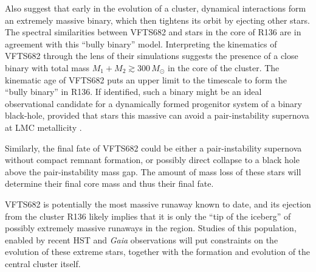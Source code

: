 \documentclass[a4paper,fleqn,usenatbib]{mnras}
\begin{document}
Also \cite{fujii:11} suggest that
early in the evolution of a cluster, dynamical interactions form an extremely
massive binary, which then tightens its orbit by ejecting other
stars. The spectral similarities between VFTS682 and stars in the core
of R136 are in agreement with this ``bully binary'' model. Interpreting the kinematics of VFTS682 through the lens of their simulations
suggests the presence of a close binary with total mass
$M_1+M_2\gtrsim 300\,M_\odot$ in the core of the cluster. The kinematic age of VFTS682 puts an
upper limit to the timescale to form the ``bully binary'' in
R136. If identified, such a binary %
might be an ideal observational candidate for a dynamically formed progenitor system of
a binary black-hole, provided that stars this massive can avoid a
pair-instability supernova \cite[e.g.,][]{rakavy:67} at LMC
metallicity \citep[see also][]{langer:07}.

Similarly, the final fate of VFTS682 could be either a
pair-instability supernova without compact remnant formation, or
possibly direct collapse to a black hole above the pair-instability
mass gap. The amount of mass loss of these stars will determine their final core
mass and thus their final fate.

VFTS682 is potentially the most massive runaway known to date, and its ejection
from the cluster R136 likely implies that it is only the ``tip of the
iceberg'' of possibly extremely massive runaways in the
region. Studies of this population, enabled by recent HST and \emph{Gaia} observations will put constraints on the evolution
of these extreme stars, together with the formation and evolution of
the central cluster itself.





\bsp	%
\label{lastpage}


\end{document}
